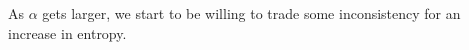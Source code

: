 \documentclass{article}
\numberwithin{equation}{section}
\begin{document}
As $\alpha$ gets larger, we start to be willing to trade some
inconsistency for an increase in entropy.
\end{document}

